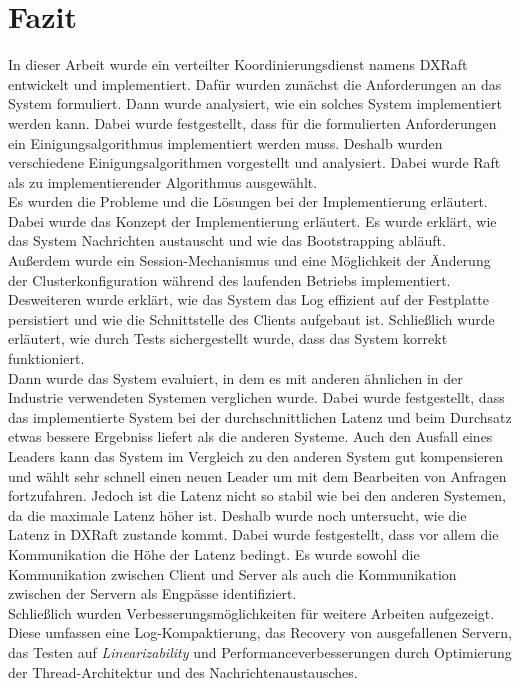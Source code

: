 \chapter{Fazit}

In dieser Arbeit wurde ein verteilter Koordinierungsdienst namens DXRaft entwickelt und implementiert. Dafür wurden zunächst die Anforderungen an das System formuliert. Dann wurde analysiert, wie ein solches System implementiert werden kann. Dabei wurde festgestellt, dass für die formulierten Anforderungen ein Einigungsalgorithmus implementiert werden muss. Deshalb wurden verschiedene Einigungsalgorithmen vorgestellt und analysiert. Dabei wurde Raft als zu implementierender Algorithmus ausgewählt. \\
Es wurden die Probleme und die Lösungen bei der Implementierung erläutert. Dabei wurde das Konzept der Implementierung erläutert. Es wurde erklärt, wie das System Nachrichten austauscht und wie das Bootstrapping abläuft. Außerdem wurde ein Session-Mechanismus und eine Möglichkeit der Änderung der Clusterkonfiguration während des laufenden Betriebs implementiert. Desweiteren wurde erklärt, wie das System das Log effizient auf der Festplatte persistiert und wie die Schnittstelle des Clients aufgebaut ist. Schließlich wurde erläutert, wie durch Tests sichergestellt wurde, dass das System korrekt funktioniert. \\
 Dann wurde das System evaluiert, in dem es mit anderen ähnlichen in der Industrie verwendeten Systemen verglichen wurde. Dabei wurde festgestellt, dass das implementierte System bei der durchschnittlichen Latenz und beim Durchsatz etwas bessere Ergebniss liefert als die anderen Systeme. Auch den Ausfall eines Leaders kann das System im Vergleich zu den anderen System gut kompensieren und wählt sehr schnell einen neuen Leader um mit dem Bearbeiten von Anfragen fortzufahren. Jedoch ist die Latenz nicht so stabil wie bei den anderen Systemen, da die maximale Latenz höher ist. Deshalb wurde noch untersucht, wie die Latenz in DXRaft zustande kommt. Dabei wurde festgestellt, dass vor allem die Kommunikation die Höhe der Latenz bedingt. Es wurde sowohl die Kommunikation zwischen Client und Server als auch die Kommunikation zwischen der Servern als Engpässe identifiziert. \\
Schließlich wurden Verbesserungsmöglichkeiten für weitere Arbeiten aufgezeigt. Diese umfassen eine Log-Kompaktierung, das Recovery von ausgefallenen Servern, das Testen auf \textit{Linearizability} und Performanceverbesserungen durch Optimierung der Thread-Architektur und des Nachrichtenaustausches.\\